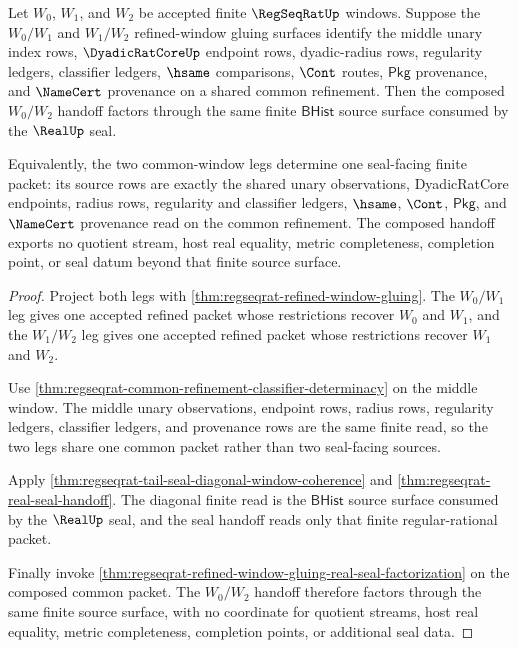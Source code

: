 \begin{theorem}
\label{thm:regseqrat-common-window-real-seal-transitivity}
Let $W_0$, $W_1$, and $W_2$ be accepted finite $\RegSeqRatUp$ windows. Suppose
the $W_0/W_1$ and $W_1/W_2$ refined-window gluing surfaces identify the middle
unary index rows, $\DyadicRatCoreUp$ endpoint rows, dyadic-radius rows,
regularity ledgers, classifier ledgers, $\hsame$ comparisons, $\Cont$ routes,
$\mathsf{Pkg}$ provenance, and $\NameCert$ provenance on a shared common
refinement. Then the composed $W_0/W_2$ handoff factors through the same
finite $\mathsf{BHist}$ source surface consumed by the $\RealUp$ seal.

Equivalently, the two common-window legs determine one seal-facing finite
packet: its source rows are exactly the shared unary observations,
DyadicRatCore endpoints, radius rows, regularity and classifier ledgers,
$\hsame$, $\Cont$, $\mathsf{Pkg}$, and $\NameCert$ provenance read on the
common refinement. The composed handoff exports no quotient stream, host real
equality, metric completeness, completion point, or seal datum beyond that
finite source surface.
\end{theorem}
\begin{proof}
Project both legs with \autoref{thm:regseqrat-refined-window-gluing}. The
$W_0/W_1$ leg gives one accepted refined packet whose restrictions recover
$W_0$ and $W_1$, and the $W_1/W_2$ leg gives one accepted refined packet whose
restrictions recover $W_1$ and $W_2$.

Use \autoref{thm:regseqrat-common-refinement-classifier-determinacy} on the
middle window. The middle unary observations, endpoint rows, radius rows,
regularity ledgers, classifier ledgers, and provenance rows are the same
finite read, so the two legs share one common packet rather than two
seal-facing sources.

Apply \autoref{thm:regseqrat-tail-seal-diagonal-window-coherence} and
\autoref{thm:regseqrat-real-seal-handoff}. The diagonal finite read is the
$\mathsf{BHist}$ source surface consumed by the $\RealUp$ seal, and the seal
handoff reads only that finite regular-rational packet.

Finally invoke
\autoref{thm:regseqrat-refined-window-gluing-real-seal-factorization} on the
composed common packet. The $W_0/W_2$ handoff therefore factors through the
same finite source surface, with no coordinate for quotient streams, host real
equality, metric completeness, completion points, or additional seal data.
\end{proof}

